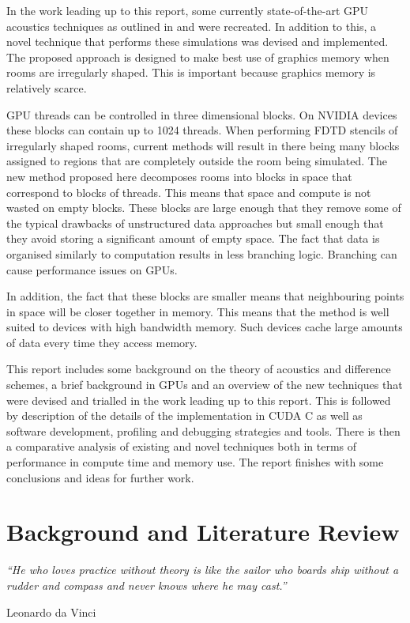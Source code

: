 \documentclass[12pt,a4paper]{report}
\begin{document}
In the work leading up to this report, some currently state-of-the-art GPU acoustics techniques as outlined in \cite{craig} and \cite{brian} were recreated. In addition to this, a novel technique that performs these simulations was devised and implemented. The proposed approach is designed to make best use of graphics memory when rooms are irregularly shaped. This is important because graphics memory is relatively scarce.

GPU threads can be controlled in three dimensional blocks. On NVIDIA devices these blocks can contain up to \num{1024} threads. When performing FDTD stencils of irregularly shaped rooms, current methods will result in there being many blocks assigned to regions that are completely outside the room being simulated. The new method proposed here decomposes rooms into blocks in space that correspond to blocks of threads. This means that space and compute is not wasted on empty blocks. These blocks are large enough that they remove some of the typical drawbacks of unstructured data approaches but small enough that they avoid storing a significant amount of empty space. The fact that data is organised similarly to computation results in less branching logic. Branching can cause performance issues on GPUs.

In addition, the fact that these blocks are smaller means that neighbouring points in space will be closer together in memory. This means that the method is well suited to devices with high bandwidth memory. Such devices cache large amounts of data every time they access memory.

This report includes some background on the theory of acoustics and difference schemes, a brief background in GPUs and an overview of the new techniques that were devised and trialled in the work leading up to this report. This is followed by description of the details of the implementation in CUDA C as well as software development, profiling and debugging strategies and tools. There is then a comparative analysis of existing and novel techniques both in terms of performance in compute time and memory use. The report finishes with some conclusions and ideas for further work.

\chapter{Background and Literature Review}

\epigraph{\itshape ``He who loves practice without theory is like the sailor who boards ship without a rudder and compass and never knows where he may cast.''}{Leonardo da Vinci}
\end{document}
